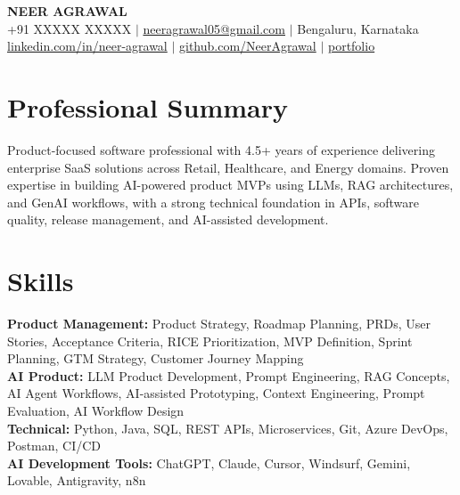 \documentclass[10pt,a4paper]{article}
\begin{document}
\sloppy

\begin{center}
    {\Huge \textbf{NEER AGRAWAL}} \\[2pt]
    +91 XXXXX XXXXX $|$
    \href{mailto:neeragrawal05@gmail.com}{neeragrawal05@gmail.com} $|$
    Bengaluru, Karnataka \\[1pt]
    \href{https://www.linkedin.com/in/neer-agrawal-7141b3201/}{linkedin.com/in/neer-agrawal}
    $|$
    \href{https://github.com/NeerAgrawal}{github.com/NeerAgrawal}
    $|$
    \href{https://nextleap.app/portfolio/neer-agrawal}{portfolio}
\end{center}

\vspace{-6pt}

\section{Professional Summary}
Product-focused software professional with 4.5+ years of experience delivering enterprise SaaS solutions across Retail, Healthcare, and Energy domains. Proven expertise in building AI-powered product MVPs using LLMs, RAG architectures, and GenAI workflows, with a strong technical foundation in APIs, software quality, release management, and AI-assisted development.

\vspace{1pt}

\section{Skills}
\textbf{Product Management:} Product Strategy, Roadmap Planning, PRDs, User Stories, Acceptance Criteria, RICE Prioritization, MVP Definition, Sprint Planning, GTM Strategy, Customer Journey Mapping \\
\textbf{AI Product:} LLM Product Development, Prompt Engineering, RAG Concepts, AI Agent Workflows, AI-assisted Prototyping, Context Engineering, Prompt Evaluation, AI Workflow Design \\
\textbf{Technical:} Python, Java, SQL, REST APIs, Microservices, Git, Azure DevOps, Postman, CI/CD \\
\textbf{AI Development Tools:} ChatGPT, Claude, Cursor, Windsurf, Gemini, Lovable, Antigravity, n8n

\vspace{1pt}
\end{document}
